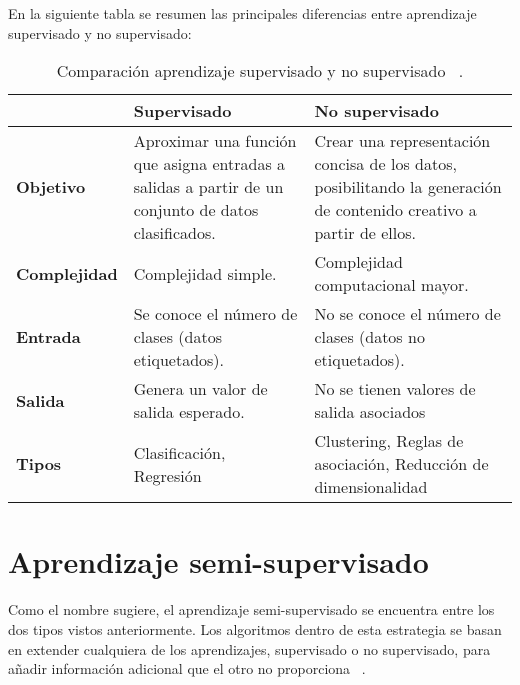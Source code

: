 


En la siguiente tabla se resumen las principales diferencias entre aprendizaje supervisado y no supervisado:
\begin{table}[ht]
	\centering
	\begin{tabular}{@{}p{2.5cm} p{5cm} p{5cm}@{}}
		\toprule
			 & \textbf{Supervisado} & \textbf{No supervisado} \\
		\midrule
		\textbf{Objetivo} & Aproximar una función que asigna entradas a salidas a partir de un conjunto de datos clasificados. & Crear una representación concisa de los datos, posibilitando la generación de contenido creativo a partir de ellos. \\
		\addlinespace[0.5em]
		\textbf{Complejidad} & Complejidad simple. & Complejidad computacional mayor.\\
		\addlinespace[0.5em]
		\textbf{Entrada} & Se conoce el número de clases (datos etiquetados). & No se conoce el número de clases (datos no etiquetados). \\
		\addlinespace[0.5em]
		\textbf{Salida} & Genera un valor de salida esperado. & No se tienen valores de salida asociados \\
		\addlinespace[0.5em]
		\textbf{Tipos} & Clasificación, Regresión & Clustering, Reglas de asociación, Reducción de dimensionalidad \\
		\bottomrule
	\end{tabular}
	\caption{Comparación aprendizaje supervisado y no supervisado ~\cite{USL:guide}.}
	\label{supervisado_VS_noSupervisado}
\end{table}
\newpage


\section{Aprendizaje semi-supervisado}
Como el nombre sugiere, el aprendizaje semi-supervisado se encuentra entre los dos tipos vistos anteriormente. Los algoritmos dentro de esta estrategia se basan en extender cualquiera de los aprendizajes, supervisado o no supervisado, para añadir información adicional que el otro no proporciona ~\cite{Intro:SemiSupervised}.


